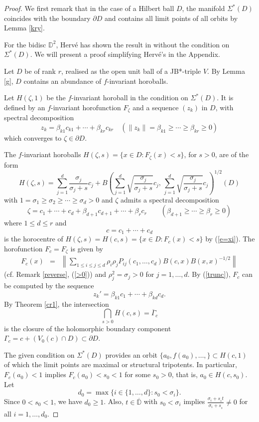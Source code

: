 \documentclass[12pt, twoside]{article}
\theoremstyle{definition}
\numberwithin{equation}{section}
\begin{document}
\begin{proof}
We first remark that in the case of a Hilbert ball $D$, the manifold $\Sigma^*(D)$ coincides with the boundary $\partial D$
and contains all limit points of all orbits by Lemma \ref{kry}.

For the bidisc $\mathbb{D}^2$, Herv\'e has shown the result in \cite{h1} without the condition on
$\Sigma^*(D)$. We will present a proof simplifying Herv\'e's in the Appendix.

Let $D$ be of rank $r$, realised  as the open unit ball of a JB*-triple $V$.
By Lemma \ref{g}, $D$ contains an abundance of $f$-invariant horoballs.

Let $H(\zeta,1)$ be  the $f$-invariant horoball in the condition on $\Sigma^*(D)$.
It is defined by an $f$-invariant horofunction $F_\zeta$ and a sequence $(z_k)$ in $D$, with spectral decomposition
$$z_k= \beta_{k1}c_{k1} + \cdots +\beta_{kr}c_{kr} \quad (\|z_k\|=\beta_{k1} \geq \cdots \geq \beta_{kr} \geq 0)$$
which converges to $\zeta\in \partial D$.

The $f$-invariant horoballs $H(\zeta,s)=\{x\in D:F_\zeta(x)<s\}$, for $s>0$, are of the form
\begin{equation}\label{hball}
H(\zeta,s) = \sum_{j=1}^d \frac{\sigma_j}{\sigma_j+s} c_j +
B\left (\sum_{j=1}^d \sqrt{\frac{\sigma_j}{\sigma_j+s}} c_j, \,\sum_{j=1}^d \sqrt{\frac{\sigma_j}{\sigma_j +s}} c_j
\right)^{1/2}(D)
\end{equation}
with $1 =\sigma_1 \geq \sigma_2 \geq \cdots \geq \sigma_d >0$
and $\zeta$ admits a spectral decomposition
$$\zeta = c_1 + \cdots + c_d + \beta_{d+1} c_{d+1} + \cdots + \beta_r c_r \qquad (
 \beta_{d+1} \geq \cdots \geq \beta_r \geq 0)$$
 where  $1\leq d \leq r$ and
$$c= c_1 + \cdots +c_d$$
is the horocentre of $H(\zeta,s)=H(c,s) = \{x\in D: F_c(x) <s\}$ by (\ref{e=xi}).
The horofunction $F_c=F_\zeta$ is given by
 \begin{eqnarray}\label{Fc}
 F_c(x) 
 &=& \left\|\sum_{1\leq i\leq j\leq d}\rho_i\rho_jP_{ij}(c_1, \ldots, c_d)B(c,x)B(x,x)^{-1/2}\right\|
 \end{eqnarray}
(cf. Remark \ref{reverse}, (\ref{>0})) and
$\rho_j^2 = \sigma_j>0$ for $j=1, \ldots, d$. By (\ref{trunc}), $F_c$ can be computed by the sequence
$$z_k' =  \beta_{k1}c_{1} + \cdots +\beta_{kd}c_{d}.$$
By Theorem \ref{cr1}, the intersection
$$ \bigcap_{s>0} \overline H(c,s) =\overline\Gamma_c $$
 is the closure of the holomorphic boundary component $\Gamma_c = c+ (V_0(c)\cap D) \subset \partial D$.

The given condition on $\Sigma^*(D)$ provides an orbit $\{a_0, f(a_0), \ldots, \}\subset H(c,1)$ of which the limit points
are  maximal or structural  tripotents. In particular, $F_c(a_0) <1$ implies $F_c(a_0) < s_0<1$ for some $s_0>0$, that is, $a_0 \in H(c,s_0)$.  Let
$$d_0 = \max\{i\in \{1, \ldots, d\}: s_0< \sigma_i\}.$$
Since $0<s_0<1$, we have $d_0 \geq 1$. Also,  $t\in \overline{\mathbb{D}}$
with $s_0 < \sigma_i$
implies $\frac{\sigma_i+s_{_0}t}{\sigma_i+s_{_0}}\neq 0$ for all $i=1, \ldots, d_0$.


\end{proof}
\end{document}
